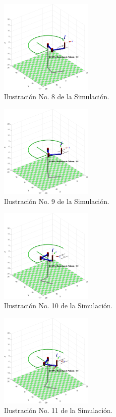 \documentclass[final]{foresj}
\begin{document}
\begin{figure}[h!]
\centering
\includegraphics[width=0.4\textwidth]{GH1.png}
\caption{Ilustración No. 8 de la Simulación.}
\label{fig:my_label}
\end{figure}

\begin{figure}[h!]
\centering
\includegraphics[width=0.4\textwidth]{GH2.png}
\caption{Ilustración No. 9 de la Simulación.}
\label{fig:my_label}
\end{figure}

\begin{figure}[h!]
\centering
\includegraphics[width=0.4\textwidth]{GHA0.png}
\caption{Ilustración No. 10 de la Simulación.}
\label{fig:my_label}
\end{figure}

\begin{figure}[h!]
\centering
\includegraphics[width=0.4\textwidth]{GHA1.png}
\caption{Ilustración No. 11 de la Simulación.}
\label{fig:my_label}
\end{figure}
\end{document}
